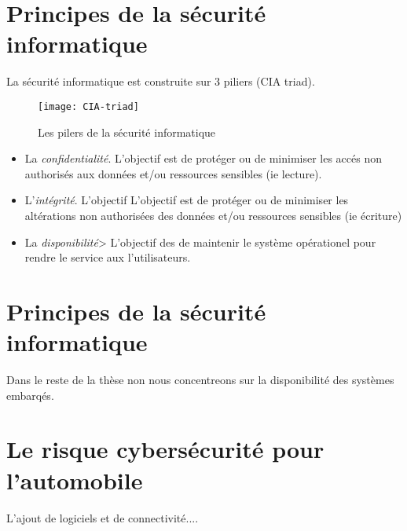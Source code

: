 \section {Principes de la s\'ecurit\'e informatique}
 \medskip
 {\Huge L}a s\'ecurit\'e informatique est construite sur 3 piliers (CIA triad).

\FloatBarrier
\begin{figure}
	\centering
    \texttt{[image: CIA-triad]}
    \caption{Les pilers de la s\'ecurit\'e informatique}
    \label{fig:CIA}
\end{figure}
\FloatBarrier
 
 
\begin{itemize}
\item La \emph{confidentialit\'e}. L'objectif est de prot\'eger ou de minimiser les acc\'es non authoris\'es aux donn\'ees et/ou ressources sensibles (ie lecture).
\item L'\emph{int\'egrit\'e}. L'objectif L'objectif est de prot\'eger ou de minimiser les alt\'erations non authoris\'ees des donn\'ees et/ou ressources sensibles (ie \'ecriture)  
\item La \emph{disponibilit\'e}> L'objectif des de maintenir le syst\`eme op\'erationel pour rendre le service aux l'utilisateurs.  
\end{itemize}

\section {Principes de la s\'ecurit\'e informatique}


Dans le reste de la th\`ese non nous concentreons sur la disponibilit\'e des syst\`emes embarq\'es. 


\section {Le risque cybers\'ecurit\'e pour l'automobile}
 \medskip
 {\Huge L}'ajout de logiciels et de connectivit\'e....


